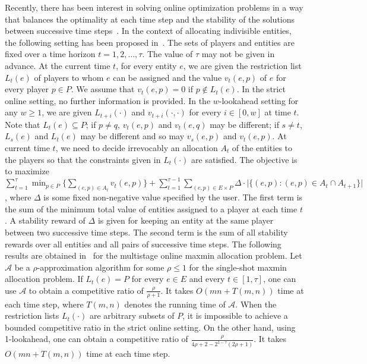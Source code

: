 \documentclass[11pt,a4paper]{article}
\renewcommand{\leq}{\leqslant}
\renewcommand{\geq}{\geqslant}
\begin{document}
Recently, there has been interest in solving online optimization problems in a way that balances the optimality at each  time step and the stability of the solutions between successive time steps~\cite{BEM18,BCN14,BCNS12,CCDL16,GTW14}.  In the context of allocating indivisible entities, the following setting has been proposed in~\cite{BEM18}.  The sets of players and entities are fixed over a time horizon $t = 1, 2, \ldots, \tau$.  The value of $\tau$ may not be given in advance.  At the current time $t$, for every entity $e$, we are given the restriction list $L_t(e)$ of players to whom $e$ can be assigned and the value $v_t(e,p)$ of $e$ for every player $p \in P$.  We assume that $v_t(e,p) = 0$ if $p \not\in L_t(e)$.  In the strict online setting, no further information is provided.  In the $w$-lookahead  setting for any $w \geq 1$, we are given $L_{t+i}(\cdot)$ and $v_{t+i}(\cdot,\cdot)$ for every $i \in [0,w]$ at time $t$.  Note that $L_t(e) \subseteq P$; if $p \not= q$, $v_t(e,p)$ and $v_t(e,q)$ may be different; if $s \not= t$, $L_s(e)$ and $L_t(e)$ may  be different and so may $v_s(e,p)$ and $v_t(e,p)$.  At current time  $t$, we need to decide irrevocably an  allocation $A_t$ of the entities to the players so that the constraints given in $L_t(\cdot)$ are satisfied.  The objective is to maximize $\sum_{t=1}^\tau \min_{p \in P} \bigl\{\sum_{(e,p) \in A_t} v_t(e,p)\bigr\} + \sum_{t=1}^{\tau-1} \sum_{(e,p) \in E \times P} \Delta \cdot \bigl|\{(e,p) : (e,p) \in A_t \cap A_{t+1}\}\bigr|$, where $\Delta$ is some fixed non-negative value specified by the user.  The first term is the sum of the minimum total value of entities assigned to a player at each  time $t$.  A stability reward of $\Delta$ is given for keeping an entity at the same player between two successive time steps.  The second term is the sum of all stability rewards over all entities and all pairs of successive time steps.   The following results are obtained in~\cite{BEM18} for the multistage online maxmin allocation problem.  Let $\mathcal{A}$ be a $\rho$-approximation algorithm for some $\rho \leq 1$ for the single-shot maxmin allocation problem.  If $L_t(e) = P$ for every $e \in E$ and every $t \in [1,\tau]$, one can use $\mathcal{A}$ to obtain a competitive ratio of  $\frac{\rho}{\rho+1}$.  It takes $O(mn+T(m,n))$ time at each time step, where $T(m,n)$ denotes the running time of $\mathcal{A}$.  When the restriction lists $L_t(\cdot)$ are arbitrary subsets of $P$, it is impossible to achieve a bounded competitive ratio in the strict online setting.  On the other hand, using 1-lookahead, one can obtain a competitive ratio of $\frac{\rho}{4\rho + 2 - 2^{1-\tau}(2\rho+1)}$.  It takes $O(mn + T(m,n))$ time at each time step.
\end{document}
